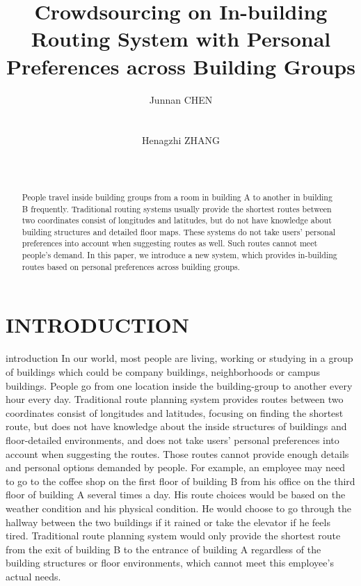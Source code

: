 \documentclass{sigchi}
\begin{document}
\title{Crowdsourcing on In-building Routing System with Personal Preferences across Building Groups}

\author{
  \alignauthor Junnan CHEN\\
    \\
    \\
  \alignauthor Henagzhi ZHANG\\
    \\
    \\
}

\maketitle

\begin{abstract}
People travel inside building groups from a room in building A to another in building B frequently. Traditional routing systems usually provide the shortest routes between two coordinates consist of longitudes and latitudes, but do not have knowledge about building structures and detailed floor maps. These systems do not take users' personal preferences into account when suggesting routes as well. Such routes cannot meet people’s demand. In this paper, we introduce a new system, which provides in-building routes based on personal preferences across building groups.
\end{abstract}


\section{INTRODUCTION}

introduction
In our world, most people are living, working or studying in a group of buildings which could be company buildings, neighborhoods or campus buildings. People go from one location inside the building-group to another every hour every day. Traditional route planning system provides routes between two coordinates consist of longitudes and latitudes, focusing on finding the shortest route, but does not have knowledge about the inside structures of buildings and floor-detailed environments, and does not take users' personal preferences into account when suggesting the routes. Those routes cannot provide enough details and personal options demanded by people.
For example, an employee may need to go to the coffee shop on the first floor of building B from his office on the third floor of building A several times a day. His route choices would be based on the weather condition and his physical condition. He would choose to go through the hallway between the two buildings if it rained or take the elevator if he feels tired. Traditional route planning system would only provide the shortest route from the exit of building B to the entrance of building A regardless of the building structures or floor environments, which cannot meet this employee's actual needs.
\end{document}
